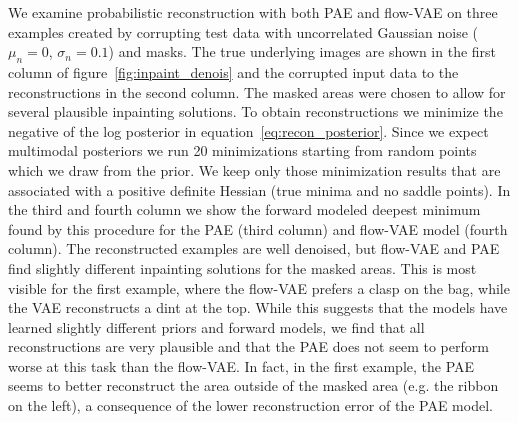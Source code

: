\documentclass[10pt]{article} \usepackage[accepted]{tmlr}
\begin{document}
We examine probabilistic reconstruction with both PAE and flow-VAE on three examples created by corrupting test data with uncorrelated Gaussian noise ($\mu_n{=}0$, $\sigma_n{=}0.1$) and masks. The true underlying images are shown in the first column of figure~\ref{fig:inpaint_denois} and the corrupted input data to the reconstructions in the second column. The masked areas were chosen to allow for several plausible inpainting solutions. 
To obtain reconstructions we minimize the negative of the log posterior in equation~\ref{eq:recon_posterior}. Since we expect multimodal posteriors we run 20 minimizations starting from random points which we draw from the prior. We keep only those minimization results that are associated with a positive definite Hessian (true minima and no saddle points). In the third and fourth column we show the forward modeled deepest minimum found by this procedure for the PAE (third column) and flow-VAE model (fourth column). The reconstructed examples are well denoised, but flow-VAE and PAE find slightly different inpainting solutions for the masked areas. This is most visible for the first example, where the flow-VAE prefers a clasp on the bag, while the VAE reconstructs a dint at the top. While this suggests that the models have learned slightly different priors and forward models, we find that all reconstructions are very plausible and that the PAE does not seem to perform worse at this task than the flow-VAE. In fact, in the first example, the PAE seems to better reconstruct the area outside of the masked area (e.g. the ribbon on the left), a consequence of the lower reconstruction error of the PAE model.
\end{document}

